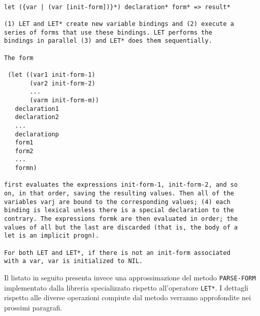\begin{lstlisting}[caption=Estratto della documentazione relativa al costrutto
\texttt{LET*}]

let ({var | (var [init-form])}*) declaration* form* => result*

(1) LET and LET* create new variable bindings and (2) execute a
series of forms that use these bindings. LET performs the
bindings in parallel (3) and LET* does them sequentially.

The form

 (let ((var1 init-form-1)
       (var2 init-form-2)
       ...
       (varm init-form-m))
   declaration1
   declaration2
   ...
   declarationp
   form1
   form2
   ...
   formn)

first evaluates the expressions init-form-1, init-form-2, and so
on, in that order, saving the resulting values. Then all of the
variables varj are bound to the corresponding values; (4) each
binding is lexical unless there is a special declaration to the
contrary. The expressions formk are then evaluated in order; the
values of all but the last are discarded (that is, the body of a
let is an implicit progn).

For both LET and LET*, if there is not an init-form associated
with a var, var is initialized to NIL.

\end{lstlisting}

Il listato in seguito presenta invece una approssimazione del metodo \texttt
{PARSE-FORM} implementato dalla libreria specializzato rispetto all'operatore
\texttt{LET*}. I dettagli rispetto alle diverse operazioni compiute dal metodo
verranno approfondite nei prossimi paragrafi.

